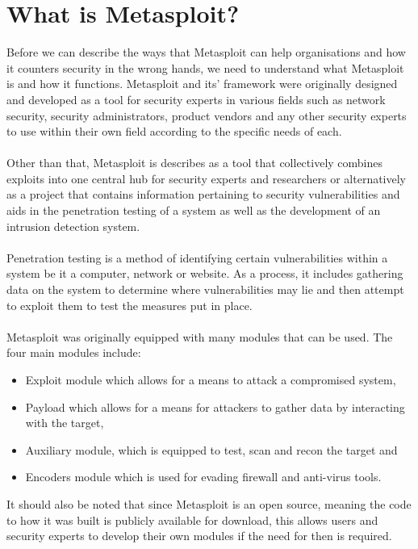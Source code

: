\documentclass[a4paper, 12pt, titlepage]{report}
\begin{document}
\section{What is Metasploit?}
Before we can describe the ways that Metasploit can help organisations and how it counters security in the wrong hands, we need to understand what Metasploit is and how it functions. Metasploit and its’ framework were originally designed and developed as a tool for security experts in various fields such as network security, security administrators, product vendors and any other security experts to use within their own field according to the specific needs of each.\cite{testIDS}
\\\\
Other than that, Metasploit is describes as a tool that collectively combines exploits into one central hub for security experts and researchers or alternatively as a project that contains information pertaining to security vulnerabilities and aids in the penetration testing of a system as well as the development of an intrusion detection system.\cite{goodDef, testIDS}
\\\\
Penetration testing is a method of identifying certain vulnerabilities within a system be it a computer, network or website. As a process, it includes gathering data on the system to determine where vulnerabilities may lie and then attempt to exploit them to test the measures put in place.\cite{goodDef}
\\\\
Metasploit was originally equipped with many modules that can be used. The four main modules include:\cite{goodDef}
\begin{itemize}
\item Exploit module which allows for a means to attack a compromised system, 
\item Payload which allows for a means for attackers to gather data by interacting with the target, 
\item Auxiliary module, which is equipped to test, scan and recon the target and \item Encoders module which is used for evading firewall and anti-virus tools. 
\end{itemize}
It should also be noted that since Metasploit is an open source, meaning the code to how it was built is publicly available for download, this allows users and security experts to develop their own modules if the need for then is required. \cite{goodDef}
\\\\
\end{document}
